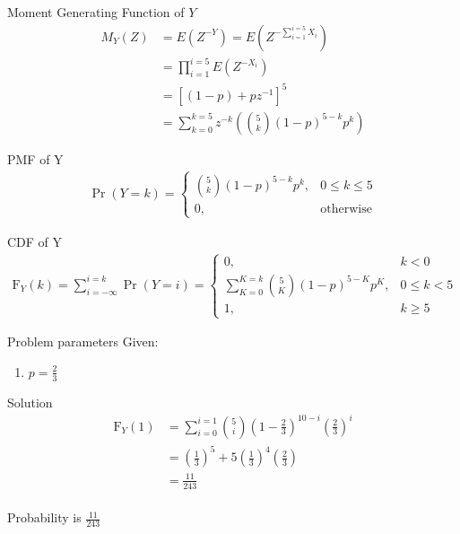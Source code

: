 \documentclass{beamer}
\providecommand{\pr}[1]{\ensuremath{\Pr\left(#1\right)}}
\providecommand{\cdf}[2]{\ensuremath{\text{F}_{#1}\left(#2\right)}}
\begin{document}
\begin{frame}

\begin{exampleblock}{Moment Generating Function of $Y$}
\begin{align}
M_Y(Z) &= E(Z^{-Y}) = E(Z^{-\sum_{i = 1}^{i = 5}X_i}) \\
&= \prod_{i = 1}^{i = 5}E(Z^{-X_i}) \\		
&= [(1 - p) + pz^{-1}]^5 \\
&= \sum_{k = 0}^{k = 5}z^{-k}(\binom{5}{k}(1 - p)^{5 - k}p^k)		
\end{align}
\end{exampleblock}
\begin{alertblock}{PMF of Y}
\begin{align}
\pr{Y = k} = 
\begin{cases}
\binom{5}{k}(1 - p)^{5 - k}p^k, & 0 \leq k \leq 5 \\
0, & \textrm{otherwise}
\end{cases}		
\end{align}
\end{alertblock}
	
\end{frame}

\begin{frame}

\begin{alertblock}{CDF of Y}
\begin{align}
\cdf{Y}{k} = \sum_{i = -\infty}^{i = k}\pr{Y = i} =
\begin{cases}
0, & k < 0 \\
\sum_{K = 0}^{K = k}\binom{5}{K}(1 - p)^{5 - K}p^K, & 0 \leq k < 5 \\
1, & k \geq 5
\end{cases}		
\end{align}
\end{alertblock}
\begin{alertblock}{Problem parameters}
Given:
\begin{enumerate}
\item $p = \frac{2}{3}$
\end{enumerate}   
\end{alertblock}
    
\end{frame}


\begin{frame}{Solution}
\begin{align}
\cdf{Y}{1} &= \sum_{i = 0}^{i = 1}\binom{5}{i}(1 - \frac{2}{3})^{10 - i}(\frac{2}{3})^i \\
&= (\frac{1}{3})^{5} + 5(\frac{1}{3})^4(\frac{2}{3})\\
&= \frac{11}{243}
\end{align}
\\
Probability is $\frac{11}{243}$
\end{frame}
\end{document}
